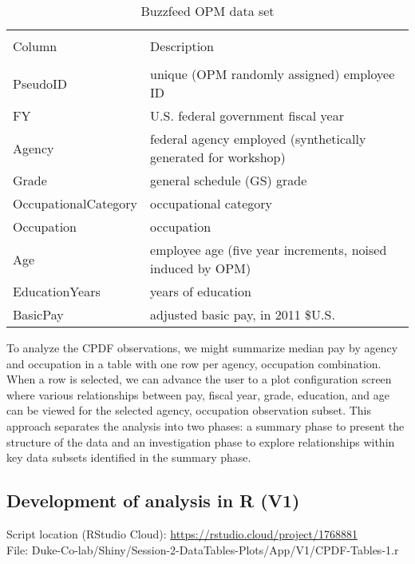 \documentclass[10pt, letterpaper]{article}
\begin{document}
\begin{spacing}{1.0}
\begin{table}[h!]
    \caption{Buzzfeed OPM data set}
    \centering
    \begin{tabular}{ll}
        \hline & \\[-8pt]
        Column & Description \\[1pt]
        \hline & \\[-4pt]
        PseudoID & unique (OPM randomly assigned) employee ID \\
        FY & U.S. federal government fiscal year \\
        Agency & federal agency employed (synthetically generated for workshop) \\
        Grade & general schedule (GS) grade \\
        OccupationalCategory & occupational category \\ 
        Occupation & occupation \\
        Age & employee age (five year increments, noised induced by OPM) \\
        EducationYears & years of education \\
        BasicPay & adjusted basic pay, in 2011 \$U.S. \\
    \end{tabular}
    \label{tb:buzzfeeddata}
\end{table}

To analyze the CPDF observations, we might summarize median pay by agency and occupation in a table with one row per agency, occupation combination.  When a row is selected, we can advance the user to a plot configuration screen where various relationships between pay, fiscal year, grade, education, and age can be viewed for the selected agency, occupation observation subset.  This approach separates the analysis into two phases:  a summary phase to present the structure of the data and an investigation phase to explore relationships within key data subsets identified in the summary phase. 


\subsection{Development of analysis in R (V1)}\label{sec:DTplotR}

Script location (RStudio Cloud): \url{https://rstudio.cloud/project/1768881}\\
File: Duke-Co-lab/Shiny/Session-2-DataTables-Plots/App/V1/CPDF-Tables-1.r\\


\end{spacing}
\end{document}

